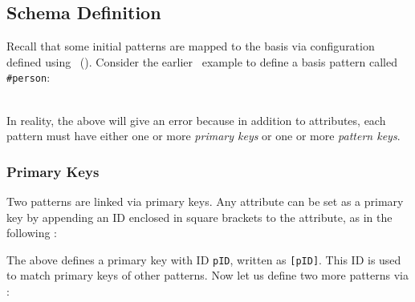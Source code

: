 \subsection{Schema Definition}%
\label{configuration}
Recall that some initial patterns are mapped to the basis via configuration defined using \dcl~(\dclfull). Consider the earlier \dcl~example to define a basis pattern called \texttt{\#person}:\\ %
\phantom{.}~~~

In reality, the above will give an error because in addition to attributes, each pattern must have either one or more {\em primary keys} or one or more {\em pattern keys}. %

\subsubsection{Primary Keys} 
\label{primarykeys}

Two patterns are linked via primary keys. Any attribute can be set as a primary key by appending an ID enclosed in square brackets to the attribute, as in the following \dcl: \\ %
{}

The above defines a primary key with ID \texttt{pID}, written as \texttt{[pID]}. This ID is used to match primary keys of other patterns. 
Now let us define two more patterns via \dcl: \\
{ 
{}\\
}

